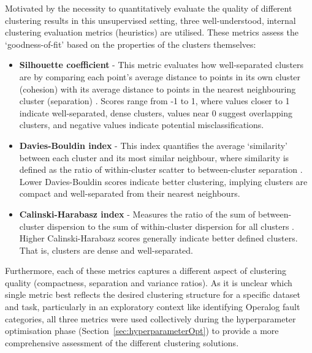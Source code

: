 \documentclass[10pt,oneside]{report}
\begin{document}
Motivated by the necessity to quantitatively evaluate the quality of different clustering results in this unsupervised setting, three well-understood, internal clustering evaluation metrics (heuristics) are utilised. These metrics assess the `goodness-of-fit' based on the properties of the clusters themselves:
\begin{itemize}

    \item \textbf{Silhouette coefficient} - This metric evaluates how well-separated clusters are by comparing each point's average distance to points in its own cluster (cohesion) with its average distance to points in the nearest neighbouring cluster (separation) \cite{rousseeuw1987silhouettes}. Scores range from -1 to 1, where values closer to 1 indicate well-separated, dense clusters, values near 0 suggest overlapping clusters, and negative values indicate potential misclassifications.

    \item \textbf{Davies-Bouldin index} - This index quantifies the average `similarity' between each cluster and its most similar neighbour, where similarity is defined as the ratio of within-cluster scatter to between-cluster separation \cite{davies1979cluster}. Lower Davies-Bouldin scores indicate better clustering, implying clusters are compact and well-separated from their nearest neighbours.

    \item \textbf{Calinski-Harabasz index} - Measures the ratio of the sum of between-cluster dispersion to the sum of within-cluster dispersion for all clusters \cite{calinski1974dendrite}. Higher Calinski-Harabasz scores generally indicate better defined clusters. That is, clusters are dense and well-separated.
\end{itemize}

Furthermore, each of these metrics captures a different aspect of clustering quality (compactness, separation and variance ratios). As it is unclear which single metric best reflects the desired clustering structure for a specific dataset and task, particularly in an exploratory context like identifying Operalog fault categories, all three metrics were used collectively during the hyperparameter optimisation phase (Section~\ref{sec:hyperparameterOpt}) to provide a more comprehensive assessment of the different clustering solutions.
\end{document}
